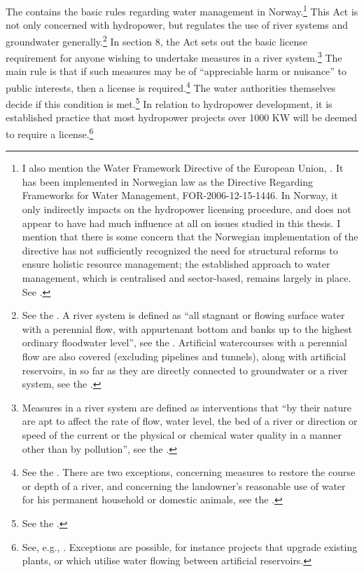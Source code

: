 The \cite{wra00} contains the basic rules regarding water management in Norway.\footnote{I also mention the Water Framework Directive of the European Union, \cite{water00}. It has been implemented in Norwegian law as the Directive Regarding Frameworks for Water Management, FOR-2006-12-15-1446. In Norway, it only indirectly impacts on the hydropower licensing procedure, and does not appear to have had much influence at all on issues studied in this thesis. I mention that there is some concern that the Norwegian implementation of the directive has not sufficiently recognized the need for structural reforms to ensure holistic resource management; the established approach to water management, which is centralised and sector-based, remains largely in place. See \cite{hanssen14}.} This Act is not only concerned with hydropower, but regulates the use of river systems and groundwater generally.\footnote{See the \dni\cite[1]{wra00}. A river system is defined as ``all stagnant or flowing surface water with a perennial flow, with appurtenant bottom and banks up to the highest ordinary floodwater level'', see the \dni\cite[2]{wra00}. Artificial watercourses with a perennial flow are also covered (excluding pipelines and tunnels), along with artificial reservoirs, in so far as they are directly connected to groundwater or a river system, see the \dni\cite[2a, 2b]{wra00}.} In section 8, the Act sets out the basic license requirement for anyone wishing to undertake measures in a river system.\footnote{Measures in a river system are defined as interventions that ``by their nature are apt to affect the rate of flow, water level, the bed of a river or direction or speed of the current or the physical or chemical water quality in a manner other than by pollution'', see the \dni\cite[3a]{wra00}.} The main rule is that if such measures may be of ``appreciable harm or nuisance''  to public interests, then a license is required.\footnote{See the \dni\cite[8]{wra00}. There are two exceptions, concerning measures to restore the course or depth of a river, and concerning the landowner's reasonable use of water for his permanent household or domestic animals, see the \dni\cite[12|15]{wra00}.} The water authorities themselves decide if this condition is met.\footnote{See the \dni\cite[18]{wra00}.} In relation to hydropower development, it is established practice that most hydropower projects over 1000 KW will be deemed to require a license.\footnote{See, e.g., \cite{nve09}. Exceptions are possible, for instance projects that upgrade existing plants, or which utilise water flowing between artificial reservoirs.}

